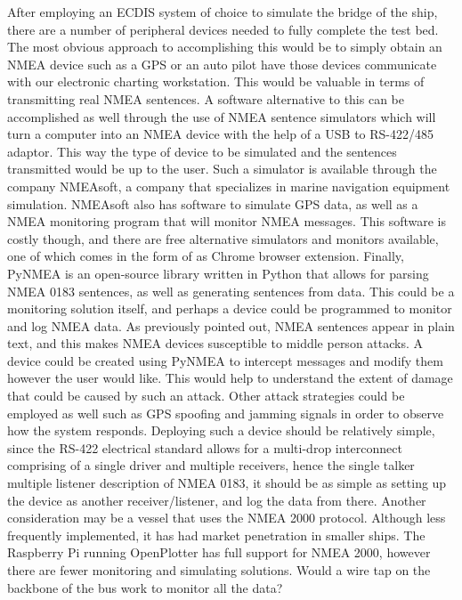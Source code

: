 \documentclass{report}
\begin{document}
\vspace{5mm} %
After employing an ECDIS system of choice to simulate the bridge of the ship, there are a number of peripheral devices needed to fully complete the test bed. The most obvious approach to accomplishing this would be to simply obtain an NMEA device such as a GPS or an auto pilot have those devices communicate with our electronic charting workstation. This would be valuable in terms of transmitting real NMEA sentences. A software alternative to this can be accomplished as well through the use of NMEA sentence simulators which will turn a computer into an NMEA device with the help of a USB to RS-422/485 adaptor. This way the type of device to be simulated and the sentences transmitted would be up to the user. Such a simulator is available through the company NMEAsoft, a company that specializes in marine navigation equipment simulation. NMEAsoft also has software to simulate GPS data, as well as a NMEA monitoring program that will monitor NMEA messages. This software is costly though, and there are free alternative simulators and monitors available, one of which comes in the form of as Chrome browser extension. 
\vspace{5mm} %
Finally, PyNMEA is an open-source library written in Python that allows for parsing NMEA 0183 sentences, as well as generating sentences from data. This could be a monitoring solution itself, and perhaps a device could be programmed to monitor and log NMEA data. As previously pointed out, NMEA sentences appear in plain text, and this makes NMEA devices susceptible to middle person attacks. A device could be created using PyNMEA to intercept messages and modify them however the user would like. This would help to understand the extent of damage that could be caused by such an attack. Other attack strategies could be employed as well such as GPS spoofing and jamming signals in order to observe how the system responds. Deploying such a device should be relatively simple, since the RS-422 electrical standard allows for a multi-drop interconnect comprising of a single driver and multiple receivers, hence the single talker multiple listener description of NMEA 0183, it should be as simple as setting up the device as another receiver/listener, and log the data from there. 
\vspace{5mm} %
Another consideration may be a vessel that uses the NMEA 2000 protocol. Although less frequently implemented, it has had market penetration in smaller ships. The Raspberry Pi running OpenPlotter has full support for NMEA 2000, however there are fewer monitoring and simulating solutions. Would a wire tap on the backbone of the bus work to monitor all the data?
\end{document}
